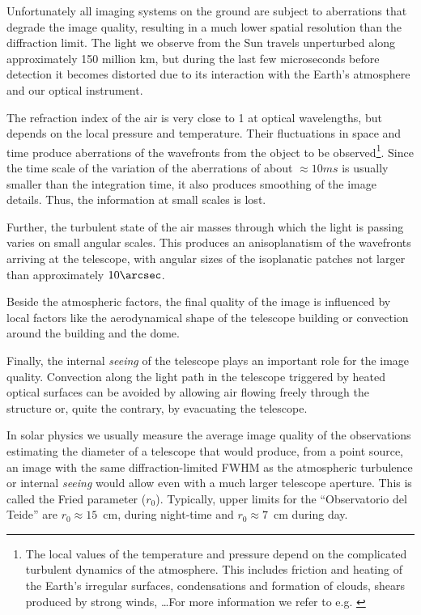 Unfortunately all imaging systems on the ground are subject to aberrations that degrade the image quality, resulting in a much lower spatial resolution than the diffraction limit. The light we observe from the Sun travels unperturbed along approximately 150 million km, but during the last few microseconds before detection it becomes distorted due to its interaction with the Earth's atmosphere and our optical instrument.

The refraction index of the air is very close to 1 at optical wavelengths, but depends on the local pressure and temperature. Their fluctuations in space and time produce aberrations of the wavefronts from the object to be observed\footnote{The local values of the temperature and pressure depend on the complicated turbulent dynamics of the atmosphere. This includes friction and heating of the Earth's irregular surfaces, condensations and formation of clouds, shears produced by strong winds, \dots For more information we refer to e.g.  \citealt{2002RvMP...74..551S}}. Since the time scale of the variation of the aberrations of about $\approx 10 ms$ is usually smaller than the integration time, it also produces smoothing of the image details. Thus, the information at small scales is lost.

Further, the turbulent state of the air masses through which the light is passing varies on small angular scales. This produces an anisoplanatism of the wavefronts arriving at the telescope, with angular sizes of the isoplanatic patches not larger than approximately $ 10\arcsec$.

Beside the atmospheric factors, the final quality of the image is influenced by local factors like the aerodynamical shape of the telescope building or convection around the building and the dome. 

Finally, the internal \emph{seeing} of the telescope plays an important role for the image quality. Convection along the light path in the telescope triggered by heated optical surfaces can be avoided by allowing air flowing freely through the structure or, quite the contrary, by evacuating the telescope.

In solar physics we usually measure the average image quality of the observations estimating the diameter of a telescope that would produce, from a point source, an image with the same diffraction-limited FWHM as the atmospheric turbulence or internal \emph{seeing} would allow even with a much larger telescope aperture. This is called the Fried parameter ($r_{0}$).  Typically, upper limits for the ``Observatorio del Teide'' are $r_{0} \approx 15$\, cm, during night-time  and $r_{0} \approx 7$\, cm during day.


